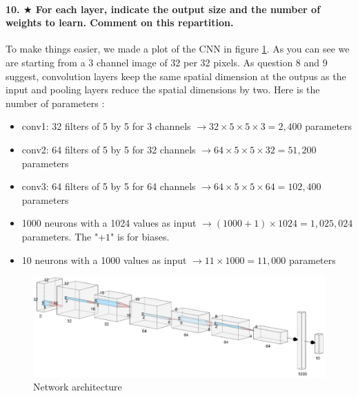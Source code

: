 \documentclass{article}
\theoremstyle{plain}%
\theoremstyle{definition}
\theoremstyle{remark}
\begin{document}
\paragraph{10. $ \bigstar $ For each layer, indicate the output size and the number of weights to learn. Comment on this repartition.}
To make things easier, we made a plot of the CNN in figure \ref{AlexNetstylelog}. As you can see we are starting from a 3 channel image of 32 per 32 pixels. As question 8 and 9 suggest, convolution layers keep the same spatial dimension at the outpus as the input and pooling layers reduce the spatial dimensions by two. 
Here is the number of parameters : 
\begin{itemize}
    \item conv1: 32 filters of 5 by 5 for 3 channels $\rightarrow 32\times 5\times 5\times 3 = 2,400$ parameters
    \item conv2: 64 filters of 5 by 5 for 32 channels $\rightarrow 64\times 5\times 5\times 32 = 51,200$ parameters
    \item conv3: 64 filters of 5 by 5 for 64 channels $\rightarrow 64\times 5\times 5\times 64 = 102,400$ parameters
    \item 1000 neurons with a 1024 values as input $\rightarrow (1000 + 1)\times 1024=1,025,024$ parameters. The "$+1$" is for biases.
    \item 10 neurons with a 1000 values as input $\rightarrow 11\times 1000=11,000$ parameters
\end{itemize}
\begin{figure}[!htbp]
    \centering
    \includegraphics*[width=\textwidth]{figs/AlexNet_style_log.png}
    \caption{Network architecture}
    \label{AlexNetstylelog}
\end{figure}
\end{document}
